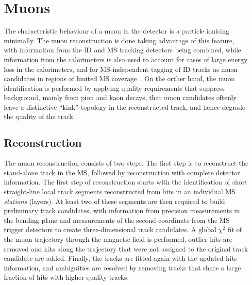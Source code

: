 





\section{Muons}
The characteristic behaviour of a muon in the detector is a particle
ionising minimally. 
The muon reconstruction is done taking advantage of this feature, 
with information from the ID and MS tracking detectors being combined, 
while information from the calorimeters is also used
to account for cases of
large energy loss in the calorimeters, and for MS-independent
tagging of ID tracks as muon candidates in regions of limited MS
coverage~\cite{CERN-EP-2020-199}.
On the orther hand, 
the muon identification is performed by applying 
quality requirements that suppress background, 
mainly from pion and kaon decays, that 
muon candidates oftenly leave a distinctive “kink” topology 
in the reconstructed track, and hence degrade the quality of the track. 


\subsection{Reconstruction}
The muon reconstruction consists of two steps. 
The first step is to reconstruct the stand-alone track in the MS,
followed by reconstruction with complete detector information.
The first step of reconstruction starts with the identification 
of short straight-line local track segments reconstructed 
from hits in an individual MS \textit{stations} (layers). 
At least two of these segments are then required
to build preliminary track candidates, 
with information from precision measurements in the bending plane 
and measurements of the second coordinate from 
the MS trigger detectors to create three-dimensional track candidates. 
A global $\chi^2$ fit of the muon trajectory 
through the magnetic field is performed,
outlier hits are removed and hits along the trajectory that
were not assigned to the original track candidate are added.
Finally, the tracks are fitted again with the updated hits information,
and ambiguities are resolved by removing tracks
that share a large fraction of hits with higher-quality tracks.

